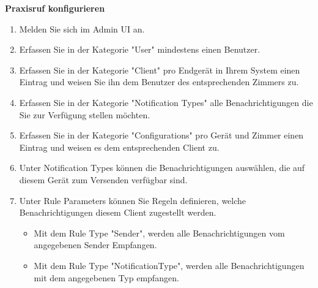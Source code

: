 \textbf{Praxisruf konfigurieren}
\begin{enumerate}
    \item Melden Sie sich im Admin UI an.
    \item Erfassen Sie in der Kategorie "User" mindestens einen Benutzer.
    \item Erfassen Sie in der Kategorie "Client" pro Endgerät in Ihrem System einen Eintrag und weisen Sie ihn dem Benutzer des entsprechenden Zimmers zu.
    \item Erfassen Sie in der Kategorie "Notification Types" alle Benachrichtigungen die Sie zur Verfügung stellen möchten.
    \item Erfassen Sie in der Kategorie "Configurations" pro Gerät und Zimmer einen Eintrag und weisen es dem entsprechenden Client zu.
    \item Unter Notification Types können die Benachrichtigungen auswählen, die auf diesem Gerät zum Versenden verfügbar sind.
    \item Unter Rule Parameters können Sie Regeln definieren, welche Benachrichtigungen diesem Client zugestellt werden.
    \begin{itemize}
        \item Mit dem Rule Type "Sender", werden alle Benachrichtigungen vom angegebenen Sender Empfangen.
        \item Mit dem Rule Type "NotificationType", werden alle Benachrichtigungen mit dem angegebenen Typ empfangen.
    \end{itemize}
\end{enumerate}

\clearpage
